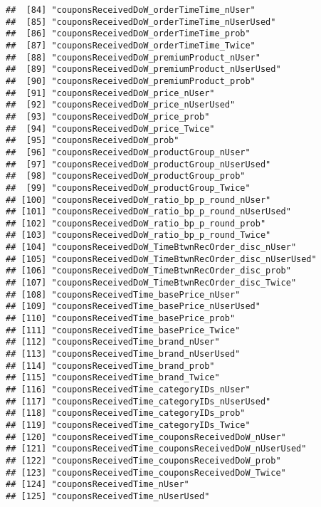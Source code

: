 \documentclass[10pt]{report}
\begin{document}
\begin{verbatim}
##  [84] "couponsReceivedDoW_orderTimeTime_nUser"             
##  [85] "couponsReceivedDoW_orderTimeTime_nUserUsed"         
##  [86] "couponsReceivedDoW_orderTimeTime_prob"              
##  [87] "couponsReceivedDoW_orderTimeTime_Twice"             
##  [88] "couponsReceivedDoW_premiumProduct_nUser"            
##  [89] "couponsReceivedDoW_premiumProduct_nUserUsed"        
##  [90] "couponsReceivedDoW_premiumProduct_prob"             
##  [91] "couponsReceivedDoW_price_nUser"                     
##  [92] "couponsReceivedDoW_price_nUserUsed"                 
##  [93] "couponsReceivedDoW_price_prob"                      
##  [94] "couponsReceivedDoW_price_Twice"                     
##  [95] "couponsReceivedDoW_prob"                            
##  [96] "couponsReceivedDoW_productGroup_nUser"              
##  [97] "couponsReceivedDoW_productGroup_nUserUsed"          
##  [98] "couponsReceivedDoW_productGroup_prob"               
##  [99] "couponsReceivedDoW_productGroup_Twice"              
## [100] "couponsReceivedDoW_ratio_bp_p_round_nUser"          
## [101] "couponsReceivedDoW_ratio_bp_p_round_nUserUsed"      
## [102] "couponsReceivedDoW_ratio_bp_p_round_prob"           
## [103] "couponsReceivedDoW_ratio_bp_p_round_Twice"          
## [104] "couponsReceivedDoW_TimeBtwnRecOrder_disc_nUser"     
## [105] "couponsReceivedDoW_TimeBtwnRecOrder_disc_nUserUsed" 
## [106] "couponsReceivedDoW_TimeBtwnRecOrder_disc_prob"      
## [107] "couponsReceivedDoW_TimeBtwnRecOrder_disc_Twice"     
## [108] "couponsReceivedTime_basePrice_nUser"                
## [109] "couponsReceivedTime_basePrice_nUserUsed"            
## [110] "couponsReceivedTime_basePrice_prob"                 
## [111] "couponsReceivedTime_basePrice_Twice"                
## [112] "couponsReceivedTime_brand_nUser"                    
## [113] "couponsReceivedTime_brand_nUserUsed"                
## [114] "couponsReceivedTime_brand_prob"                     
## [115] "couponsReceivedTime_brand_Twice"                    
## [116] "couponsReceivedTime_categoryIDs_nUser"              
## [117] "couponsReceivedTime_categoryIDs_nUserUsed"          
## [118] "couponsReceivedTime_categoryIDs_prob"               
## [119] "couponsReceivedTime_categoryIDs_Twice"              
## [120] "couponsReceivedTime_couponsReceivedDoW_nUser"       
## [121] "couponsReceivedTime_couponsReceivedDoW_nUserUsed"   
## [122] "couponsReceivedTime_couponsReceivedDoW_prob"        
## [123] "couponsReceivedTime_couponsReceivedDoW_Twice"       
## [124] "couponsReceivedTime_nUser"                          
## [125] "couponsReceivedTime_nUserUsed"                      

\end{verbatim}
\end{document}
